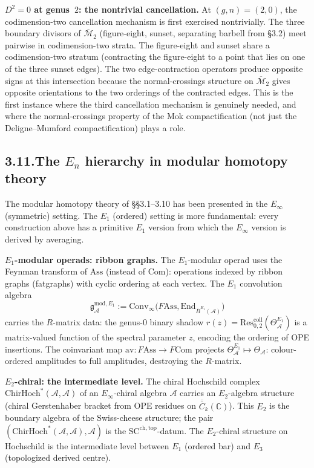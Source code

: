 \documentclass[11pt,reqno]{amsart}
\theoremstyle{definition}
\theoremstyle{remark}
\providecommand{\cA}{\mathcal{A}}
\providecommand{\cM}{\mathcal{M}}
\providecommand{\barB}{\bar{B}}
\providecommand{\Res}{\mathrm{Res}}
\providecommand{\FM}{\overline{C}}
\providecommand{\bC}{\mathbb{C}}
\providecommand{\Ass}{\mathrm{Ass}}
\providecommand{\Com}{\mathrm{Com}}
\providecommand{\SCchtop}{\mathrm{SC}^{\mathrm{ch,top}}}
\providecommand{\Convinf}{\mathrm{Conv}_\infty}
\providecommand{\ChirHoch}{\mathrm{ChirHoch}}
\providecommand{\End}{\mathrm{End}}
\numberwithin{equation}{section}
\begin{document}
\medskip
\noindent\textbf{$D^2=0$ at genus~$2$: the nontrivial cancellation.}\enspace
At $(g,n)=(2,0)$, the codimension-two cancellation mechanism is first
exercised nontrivially. The three boundary divisors of
$\overline{\cM}_2$ (figure-eight, sunset, separating barbell from
\S3.2) meet pairwise in codimension-two strata.
The figure-eight and sunset share a codimension-two stratum
(contracting the figure-eight to a point that lies on one of the
three sunset edges). The two edge-contraction operators produce
opposite signs at this intersection because the normal-crossings
structure on $\overline{\cM}_2$ gives opposite orientations to the
two orderings of the contracted edges. This is the first instance
where the third cancellation mechanism is genuinely needed, and
where the normal-crossings property of the Mok compactification (not
just the Deligne--Mumford compactification) plays a role.

\subsection*{3.11.\enspace The $E_n$ hierarchy in modular homotopy theory}

The modular homotopy theory of \S\S3.1--3.10 has been presented in the
$E_\infty$ (symmetric) setting. The $E_1$ (ordered) setting is more
fundamental: every construction above has a primitive $E_1$ version
from which the $E_\infty$ version is derived by averaging.

\medskip
\noindent\textbf{$E_1$-modular operads: ribbon graphs.}\enspace
The $E_1$-modular operad uses the Feynman transform of $\Ass$
(instead of $\Com$): operations indexed by ribbon graphs (fatgraphs)
with cyclic ordering at each vertex. The $E_1$ convolution algebra
\[
\mathfrak g^{\mathrm{mod},E_1}_\cA:=\Convinf\bigl(F\!\Ass,\End_{\barB^{E_1}(\cA)}\bigr)
\]
carries the $R$-matrix data: the genus-$0$ binary shadow
$r(z)=\Res^{\mathrm{coll}}_{0,2}(\Theta^{E_1}_\cA)$ is a matrix-valued
function of the spectral parameter $z$, encoding the ordering of
OPE insertions. The coinvariant map
$\mathrm{av}\colon F\!\Ass\to F\Com$ projects
$\Theta^{E_1}_\cA\mapsto\Theta_\cA$: colour-ordered amplitudes to
full amplitudes, destroying the $R$-matrix.

\medskip
\noindent\textbf{$E_2$-chiral: the intermediate level.}\enspace
The chiral Hochschild complex $\ChirHoch^*(\cA,\cA)$ of an
$E_\infty$-chiral algebra $\cA$ carries an $E_2$-algebra structure
(chiral Gerstenhaber bracket from OPE residues on $\overline{\FM}_k(\bC)$).
This $E_2$ is the boundary algebra of the Swiss-cheese structure; the
pair $(\ChirHoch^*(\cA,\cA),\cA)$ is the $\SCchtop$-datum. The
$E_2$-chiral structure on Hochschild is the intermediate level between
$E_1$ (ordered bar) and $E_3$ (topologized derived centre).
\end{document}
